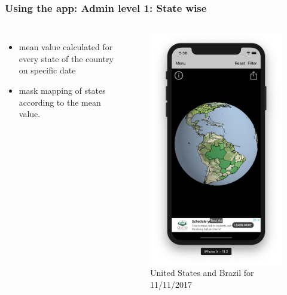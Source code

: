 \begin{frame}
\frametitle{Using the app: Admin level 1: State wise}
\begin{columns}

 \begin{itemize}
       \item mean value calculated for every state of the country on specific date
       \item mask mapping of states according to the mean value.
   \end{itemize}

\begin{figure}
    \centering
    \begin{minipage}{.5\columnwidth}
    \includegraphics[width=1.0\linewidth]{final/figures/admin_level_1_b.png}
    \caption{United States and Brazil for 11/11/2017}
    \end{minipage}
\end{figure}
\end{columns}
\end{frame}

